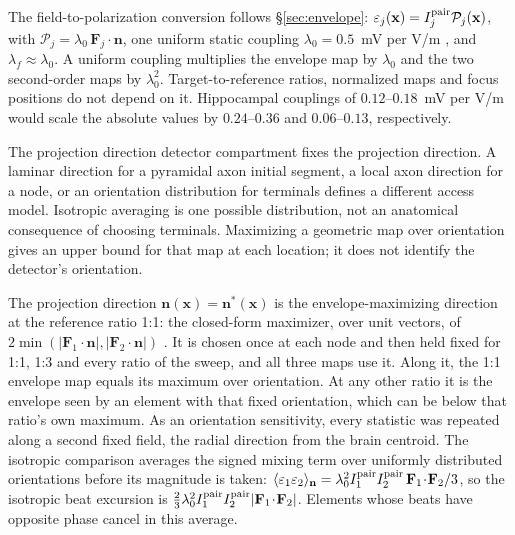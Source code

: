 \documentclass[11pt,a4paper]{article}
\providecommand{\DIFaddtex}[1]{{\protect\color{blue} \sf #1}} %
\providecommand{\DIFdeltex}[1]{{\protect\color{red} \scriptsize #1}} %
\providecommand{\DIFaddbegin}{} %
\providecommand{\DIFaddend}{} %
\providecommand{\DIFdelbegin}{} %
\providecommand{\DIFdelend}{} %
\providecommand{\DIFadd}[1]{\texorpdfstring{\DIFaddtex{#1}}{#1}} %
\providecommand{\DIFdel}[1]{\texorpdfstring{\DIFdeltex{#1}}{}} %
\begin{document}
The field-to-polarization conversion follows \S\ref{sec:envelope}:
$\varepsilon_j(\mathbf x)=I_j^{\rm pair}\mathcal P_j(\mathbf x)$, with
$\mathcal P_j=\lambda_0\,\mathbf F_j\!\cdot\!\mathbf n$, one uniform
static coupling $\lambda_0=0.5$~mV per V/m \cite{radman2009}, and
$\lambda_f\approx\lambda_0$. A uniform coupling multiplies the envelope map by
$\lambda_0$ and the two second-order maps by $\lambda_0^2$. Target-to-reference ratios,
normalized maps and focus positions do not depend on it. Hippocampal couplings of
$0.12$--$0.18$~mV per V/m \cite{bikson2004,deans2007} would scale the absolute values
by $0.24$--$0.36$ and $0.06$--$0.13$, respectively.

The \DIFdelbegin \DIFdel{projection direction }\DIFdelend \DIFaddbegin \DIFadd{detector compartment fixes the projection direction. A laminar direction for a pyramidal
axon initial segment, a local axon direction for a node, or an orientation
distribution for terminals defines a different access model. Isotropic averaging
is one possible distribution, not an anatomical consequence of choosing terminals.
Maximizing a geometric map over orientation gives an upper bound for that map
at each location; it does not identify the detector's orientation.
}

\DIFadd{The projection direction }\DIFaddend $\mathbf n(\mathbf x)=\mathbf n^*(\mathbf x)$ is the envelope-maximizing direction at
the reference ratio 1:1: the closed-form maximizer, over unit vectors, of
$2\min(|\mathbf F_1\!\cdot\!\mathbf n|,|\mathbf F_2\!\cdot\!\mathbf n|)$
\cite{grossman2017}. It is chosen once at each node and then held fixed for 1:1, 1:3
and every ratio of the sweep, and all three maps use it. Along it, the 1:1 envelope map
equals its maximum over orientation. At any other ratio it is the envelope seen by an
element with that fixed orientation, which can be below that ratio's own maximum. As an
orientation sensitivity, every statistic was repeated along a second fixed field, the
radial direction from the brain centroid. The isotropic comparison averages the signed
mixing term over uniformly distributed orientations before its magnitude is taken:
$\langle\varepsilon_1\varepsilon_2\rangle_{\mathbf n}
=\lambda_0^2I_1^{\rm pair}I_2^{\rm pair}\,\mathbf F_1\!\cdot\!\mathbf F_2/3$, so the
isotropic beat excursion is
$\tfrac23\lambda_0^2I_1^{\rm pair}I_2^{\rm pair}|\mathbf F_1\!\cdot\!\mathbf F_2|$.
Elements whose beats have opposite phase cancel in this average.
\end{document}
